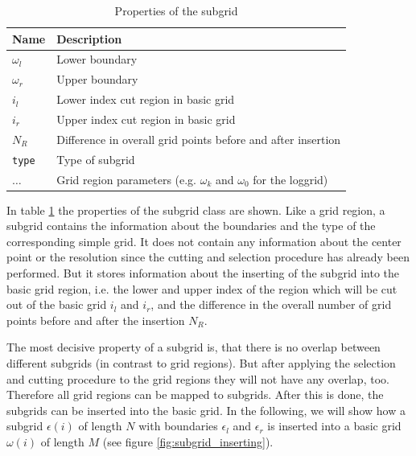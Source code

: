 \begin{table}[h]
	\begin{center}
		\begin{tabular}{ll}
		Name & Description \\ 
		\hline
		$\omega_l$  & Lower boundary \\
		$\omega_r$  & Upper boundary \\
		$i_l$       & Lower index cut region in basic grid \\
		$i_r$       & Upper index cut region in basic grid \\
		$N_R$       & Difference in overall grid points before and after insertion \\
		\texttt{type}  & Type of subgrid \\
		$\dots$ & Grid region parameters (e.g. $\omega_k$ and $\omega_0$ for the loggrid) \\
		\end{tabular}
	\end{center}
	\caption{Properties of the subgrid}
	\label{tab:subgrid}
\end{table}

In table \ref{tab:subgrid} the properties of the subgrid class are shown. Like a grid region, a subgrid contains the information about the boundaries and the type of the corresponding simple grid. It does not contain any information about the center point or the resolution since the cutting and selection procedure has already been performed. But it stores information about the inserting of the subgrid into the basic grid region, i.e. the lower and upper index of the region which will be cut out of the basic grid $i_l$ and $i_r$, and the difference in the overall number of grid points before and after the insertion $N_{R}$. 

The most decisive property of a subgrid is, that there is no overlap between different subgrids (in contrast to grid regions). But after applying the selection and cutting procedure to the grid regions they will not have any overlap, too. Therefore all grid regions can be mapped to subgrids. After this is done, the subgrids can be inserted into the basic grid. In the following, we will show how a subgrid $\epsilon(i)$ of length $N$ with boundaries $\epsilon_l$ and $\epsilon_r$ is inserted into a basic grid $\omega(i)$ of length $M$ (see figure \ref{fig:subgrid_inserting}). 

